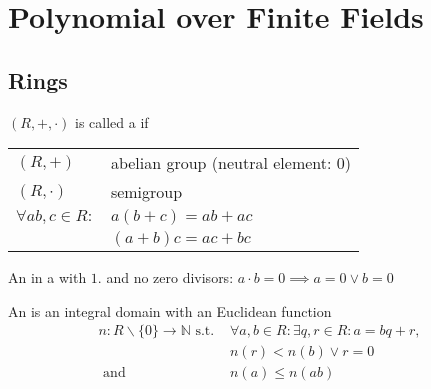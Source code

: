 

\section{Polynomial over Finite Fields}

\subsection{Rings}
\begin{definition}
$(R,+,\cdot)$ is called a  if
\begin{tabular}{ll}
  $(R,+)$ & abelian group (neutral element: 0)\\
  $(R,\cdot)$ & semigroup \\
  $\forall ab,c \in R:$ & $a(b+c) = ab+ac$\\
                        & $(a+b)c = ac+bc$\\
\end{tabular}
\end{definition}

\begin{definition}
An  in a  with $1$.
and no zero divisors: $a\cdot b = 0 \implies a=0 \lor b = 0$
\end{definition}

\begin{definition}
An  is an integral domain with an Euclidean function
\begin{align*}
  n: R \backslash \{0\} \rightarrow \mathbb{N} \text{ s.t. } &\forall a,b \in R: \exists q,r \in R: a = bq + r, \\
  &n(r) < n(b) \lor r=0 \\
  \text{ and } &n(a) \leq n(ab)
\end{align*}
\end{definition}

